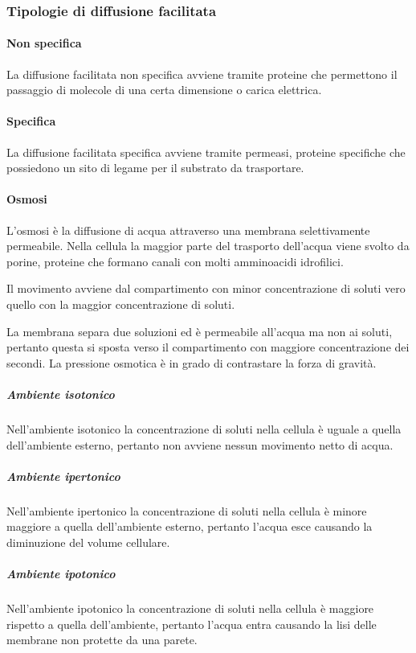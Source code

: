 		\subsubsection{Tipologie di diffusione facilitata}

			\paragraph{Non specifica}
			La diffusione facilitata non specifica avviene tramite proteine che permettono il passaggio di molecole di una certa dimensione o carica elettrica.

			\paragraph{Specifica}
			La diffusione facilitata specifica avviene tramite permeasi, proteine specifiche che possiedono un sito di legame per il substrato da trasportare.

			\paragraph{Osmosi}
			L'osmosi \`e la diffusione di acqua attraverso una membrana selettivamente permeabile.
			Nella cellula la maggior parte del trasporto dell'acqua viene svolto da porine, proteine che formano canali con molti amminoacidi idrofilici.

			Il movimento avviene dal compartimento con minor concentrazione di soluti vero quello con la maggior concentrazione di soluti. 

			La membrana separa due soluzioni ed \`e permeabile all'acqua ma non ai soluti, pertanto questa si sposta verso il compartimento con maggiore concentrazione dei secondi.
			La pressione osmotica \`e in grado di contrastare la forza di gravit\`a.

				\subparagraph{Ambiente isotonico}
				Nell'ambiente isotonico la concentrazione di soluti nella cellula \`e uguale a quella dell'ambiente esterno, pertanto non avviene nessun movimento netto di acqua.

				\subparagraph{Ambiente ipertonico}
				Nell'ambiente ipertonico la concentrazione di soluti nella cellula \`e minore maggiore a quella dell'ambiente esterno, pertanto l'acqua esce causando la diminuzione del volume cellulare.

				\subparagraph{Ambiente ipotonico}
				Nell'ambiente ipotonico la concentrazione di soluti nella cellula \`e maggiore rispetto a quella dell'ambiente, pertanto l'acqua entra causando la lisi delle membrane non protette da una parete.

